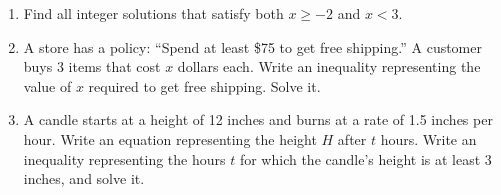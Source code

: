 \documentclass[12pt, letterpaper, fleqn]{article}
\begin{document}
\begin{enumerate}[itemsep=2.4cm, leftmargin=0.6cm]

\item Find all integer solutions that satisfy both $x \ge -2$ and $x < 3$.

\vspace{2.3cm}

\item A store has a policy: ``Spend at least \$75 to get free shipping.'' A customer buys 3 items that cost $x$ dollars each. Write an inequality representing the value of $x$ required to get free shipping. Solve it.

\vspace{2.3cm}

\item A candle starts at a height of 12 inches and burns at a rate of 1.5 inches per hour. Write an equation representing the height $H$ after $t$ hours. Write an inequality representing the hours $t$ for which the candle's height is at least 3 inches, and solve it.

\vspace{2.5cm}

\end{enumerate}
\end{document}
